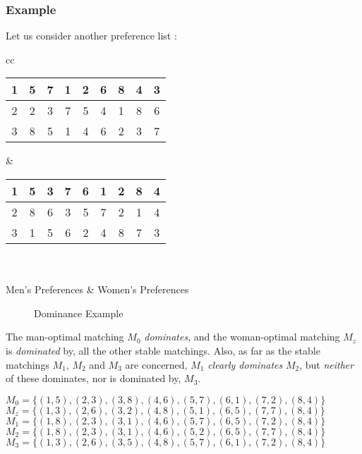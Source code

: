 \subsubsection{Example}
Let us consider another preference list :
\begin{center}
\begin{tabular}{ cc }   %
\begin{tabular}{ |c||c|c|c|c|c|c|c|c| } 
\hline
1 & 5 & 7 & 1 & 2 & 6 & 8 & 4 & 3\\
\hline
2 & 2 & 3 & 7 & 5 & 4 & 1 & 8 & 6\\
\hline
3 & 8 & 5 & 1 & 4 & 6 & 2 & 3 & 7\\
\hline
\end{tabular} &  %
\begin{tabular}{ |c||c|c|c|c|c|c|c|c|} 
\hline
1 & 5 & 3 & 7 & 6 & 1 & 2 & 8 & 4\\
\hline
2 & 8 & 6 & 3 & 5 & 7 & 2 & 1 & 4\\
\hline
3 & 1 & 5 & 6 & 2 & 4 & 8 & 7 & 3\\
\hline
\end{tabular} \\ \\
Men's Preferences & Women's Preferences
\end{tabular}
\begin{figure}[ht]
  \caption{Dominance Example}
  \label{FIG_1_11}
\end{figure}
\end{center}
\newpage
The man-optimal matching $M_0$ \textit{dominates}, and the woman-optimal matching $M_z$ is \textit{dominated} by, all the other stable matchings. Also, as far as the stable matchings $M_1$, $M_2$ and $M_3$ are concerned, $M_1$ \textit{clearly dominates} $M_2$, but \textit{neither} of these dominates, nor is dominated by, $M_3$.

    \begin{center}
    $M_0 = \{(1, 5),(2, 3),(3, 8),(4, 6),(5, 7),(6, 1),(7, 2),(8, 4)\}$
    $M_z = \{(1, 3),(2, 6),(3, 2),(4, 8),(5, 1),(6, 5),(7, 7),(8, 4)\}$
    $M_1 = \{(1, 8),(2, 3),(3, 1),(4, 6),(5, 7),(6, 5),(7, 2),(8, 4)\}$
    $M_2 = \{(1, 8),(2, 3),(3, 1),(4, 6),(5, 2),(6, 5),(7, 7),(8, 4)\}$
    $M_3 = \{(1, 3),(2, 6),(3, 5),(4, 8),(5, 7),(6, 1),(7, 2),(8, 4)\}$
    \end{center}
     
